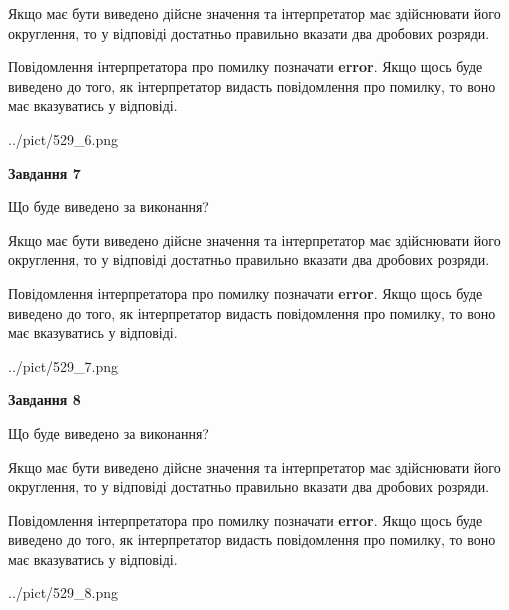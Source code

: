 \documentclass[12pt, ukrainian]{article}
\begin{document}
{\begin {Large}
Якщо має бути виведено дійсне значення та інтерпретатор має здійснювати його округлення, 
то у відповіді достатньо правильно вказати два дробових розряди.

Повідомлення інтерпретатора про помилку позначати \textbf{error}.
Якщо щось буде виведено до того, як інтерпретатор видасть повідомлення про помилку, 
то воно має вказуватись у відповіді. \par

\begin{center}
	{../pict/529_6.png}
\end{center}
\newpage

{\begin {center}\textbf{Завдання 7}\end {center}}\par
Що буде виведено за виконання? \par

Якщо має бути виведено дійсне значення та інтерпретатор має здійснювати його округлення, 
то у відповіді достатньо правильно вказати два дробових розряди.

Повідомлення інтерпретатора про помилку позначати \textbf{error}.
Якщо щось буде виведено до того, як інтерпретатор видасть повідомлення про помилку, 
то воно має вказуватись у відповіді. \par

\begin{center}
	{../pict/529_7.png}
\end{center}
\newpage

{\begin {center}\textbf{Завдання 8}\end {center}}\par
Що буде виведено за виконання? \par

Якщо має бути виведено дійсне значення та інтерпретатор має здійснювати його округлення, 
то у відповіді достатньо правильно вказати два дробових розряди.

Повідомлення інтерпретатора про помилку позначати \textbf{error}.
Якщо щось буде виведено до того, як інтерпретатор видасть повідомлення про помилку, 
то воно має вказуватись у відповіді. \par

\begin{center}
	{../pict/529_8.png}
\end{center}
\newpage


\end{Large}}
\end{document}
